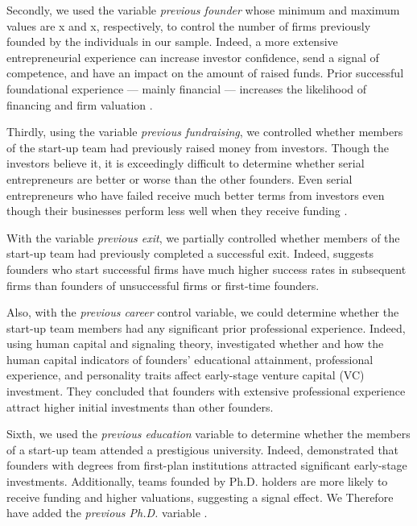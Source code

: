 \documentclass[12pt]{article}
\begin{document}
Secondly, we used the variable \textit{previous founder} whose minimum and maximum values are x and x, respectively, to control the number of firms previously founded by the individuals in our sample. Indeed, a more extensive entrepreneurial experience can increase investor confidence, send a signal of competence, and have an impact on the amount of raised funds. Prior successful foundational experience — mainly financial — increases the likelihood of financing and firm valuation \citep{hsu2007experienced}.

Thirdly, using the variable \textit{previous fundraising}, we controlled whether members of the start-up team had previously raised money from investors. Though the investors believe it, it is exceedingly difficult to determine whether serial entrepreneurs are better or worse than the other founders. Even serial entrepreneurs who have failed receive much better terms from investors even though their businesses perform less well when they receive funding \citep{nahata2019success}.

With the variable \textit{previous exit}, we partially controlled whether members of the start-up team had previously completed a successful exit. Indeed, \citet{gompers2010performance} suggests founders who start successful firms have much higher success rates in subsequent firms than founders of unsuccessful firms or first-time founders.

Also, with the \textit{previous career} control variable, we could determine whether the start-up team members had any significant prior professional experience. Indeed, using human capital and signaling theory,  \citet{subramanian2022backing} investigated whether and how the human capital indicators of founders' educational attainment, professional experience, and personality traits affect early-stage venture capital (VC) investment. They concluded that founders with extensive professional experience attract higher initial investments than other founders.

Sixth, we used the \textit{previous education} variable to determine whether the members of a start-up team attended a prestigious university. Indeed, \citet{ratzinger2018impact} demonstrated that founders with degrees from first-plan institutions attracted significant early-stage investments. Additionally, teams founded by Ph.D. holders are more likely to receive funding and higher valuations, suggesting a signal effect. We Therefore have added the \textit{previous Ph.D.} variable \citep{hsu2007experienced}.
\end{document}
